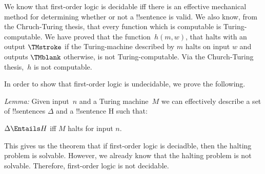 \documentclass[../../../include/open-logic-section]{subfiles}
\begin{document}

\begin{explain}
We know that first-order logic is decidable iff there is an effective mechanical
method for determining whether or not a !!{sentence} is valid. We also know, from
the Chruch-Turing thesis, that every function which is computable is 
Turing-computable. We have proved that the function~$h(m,w)$, that halts with
an output $\TMstroke$ if the Turing-machine described by $m$ halts on input $w$ 
and outputs $\TMblank$ otherwise, is not Turing-computable. Via the Church-Turing
thesis,~$h$ is not computable. 

In order to show that first-order logic is undecidable, we prove the following.

\emph{Lemma:} Given input~$n$ and a Turing machine~$M$ we can effectively 
describe a set of !!{sentence}s $\Delta$ and a !!{sentence} H such that:

$\Delta \Entails H$ iff $M$ halts for input $n$.
\end{explain}

This gives us the theorem that if first-order logic is deciadble, then the halting problem
is solvable. However, we already know that the halting problem is not solvable. 
Therefore, first-order logic is not decidable.
\end{document}
